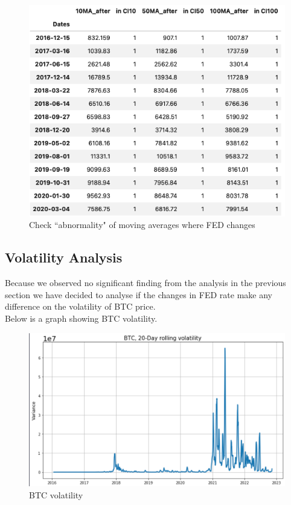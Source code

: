 \documentclass[12pt]{article}
\begin{document}
\begin{figure}[H]
   \includegraphics[scale=0.7]{research_project/text/paper/ma_ci.png}
   \centering
   \caption{Check ``abnormality" of moving averages where FED changes}
   \label{fig:ci}
\end{figure}
\subsection{Volatility Analysis}
Because we observed no significant finding from the analysis in the previous section we have decided to analyse if the changes in FED rate make any difference on the volatility of BTC price.\\
Below is a graph showing BTC volatility.
\begin{figure}[H]
   \includegraphics[scale=0.7]{research_project/text/paper/6.png}
   \centering
   \caption{BTC volatility}
   \label{fig:FED Rate evolution 2016 - 2022}
\end{figure}
\end{document}
